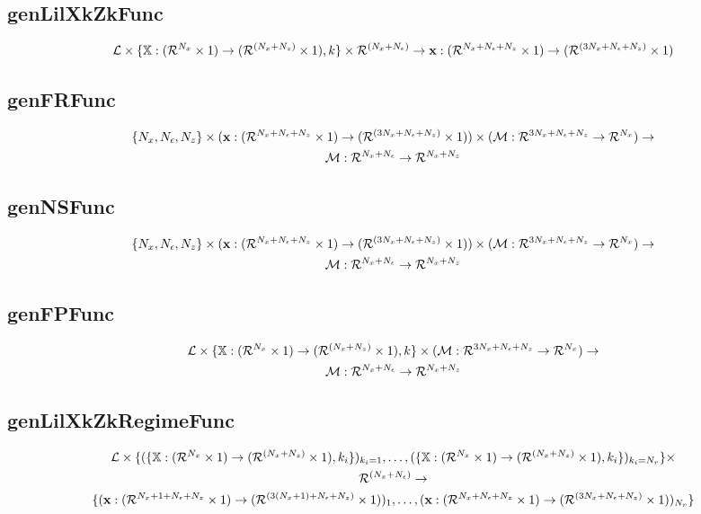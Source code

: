 \documentclass[12pt]{article}
\begin{document}
\subsection{genLilXkZkFunc}
\label{sec:genlilxkzkfunc}
\begin{gather*}
\linMod \times \{  \bigXFuncSig, k \} \times \Rn{(\numX+\numEps)} \rightarrow
\lilXFuncSig
\end{gather*}

\subsection{genFRFunc}
\label{sec:genfrfunc}


\begin{gather*}
\{\numX,\numEps,\numZ\}\times(\lilXFuncSig)\times (\eqnFuncSig)    \rightarrow\\
\frfpnsFuncSig
\end{gather*}



\subsection{genNSFunc}
\label{sec:gennsfunc}

\begin{gather*}
\{\numX,\numEps,\numZ\}\times(\lilXFuncSig)\times (\eqnFuncSig)    \rightarrow\\
\frfpnsFuncSig
\end{gather*}


\subsection{genFPFunc}
\label{sec:genfpfunc}
\begin{gather*}
\linMod \times \{  \bigXFuncSig, k \} \times (\eqnFuncSig)    \rightarrow\\ 
\frfpnsFuncSig
\end{gather*}



\subsection{genLilXkZkRegimeFunc}
\label{sec:genlilxkzkregimefunc}
{\small
\begin{gather*}
\linMod \times \{(\{  \bigXFuncSig, k_i \})_{k_i=1},\ldots,(\{  \bigXFuncSig, k_i \})_{k_i=\numR}\} \times\\ \Rn{(\numX+\numEps)} \rightarrow\\
\{(\lilXRegimeFuncSig)_1,\ldots,(\lilXFuncSig)_{\numR}\}
\end{gather*}
}
\end{document}
